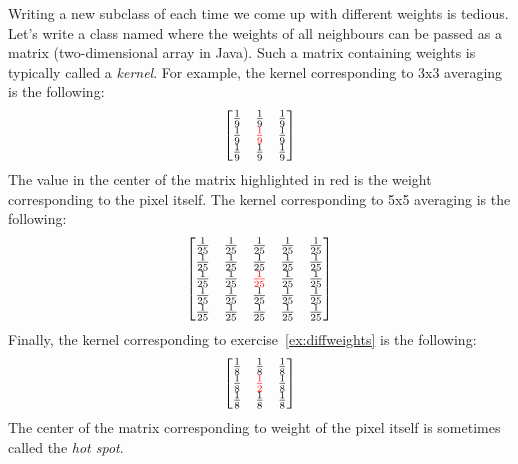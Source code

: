 \documentclass{book}
\begin{document}
Writing a new subclass of  each time we come up with different weights is tedious. Let's write a class named  where the weights of all neighbours can be passed as a matrix (two-dimensional array in Java). Such a matrix containing weights is typically called a \emph{kernel}. For example, the kernel corresponding to 3x3 averaging is the following:
$$
 \begin{bmatrix}
  \frac{1}{9} & \frac{1}{9} & \frac{1}{9} \\
  \frac{1}{9} & \textcolor{red}{\frac{1}{9}} & \frac{1}{9} \\
  \frac{1}{9} & \frac{1}{9} & \frac{1}{9}
 \end{bmatrix}
$$
The value in the center of the matrix highlighted in red is the weight corresponding to the pixel itself. The kernel corresponding to 5x5 averaging is the following:
$$
 \begin{bmatrix}
  \frac{1}{25} & \frac{1}{25} & \frac{1}{25} & \frac{1}{25} & \frac{1}{25}\\
  \frac{1}{25} & \frac{1}{25} & \frac{1}{25} & \frac{1}{25} & \frac{1}{25}\\
  \frac{1}{25} & \frac{1}{25} & \textcolor{red}{\frac{1}{25}} & \frac{1}{25} & \frac{1}{25}\\
  \frac{1}{25} & \frac{1}{25} & \frac{1}{25} & \frac{1}{25} & \frac{1}{25}\\
  \frac{1}{25} & \frac{1}{25} & \frac{1}{25} & \frac{1}{25} & \frac{1}{25}
 \end{bmatrix}
$$
Finally, the kernel corresponding to exercise~\ref{ex:diffweights} is the following:
$$
 \begin{bmatrix}
  \frac{1}{8} & \frac{1}{8} & \frac{1}{8} \\
  \frac{1}{8} & \textcolor{red}{\frac{1}{2}} & \frac{1}{8} \\
  \frac{1}{8} & \frac{1}{8} & \frac{1}{8}
 \end{bmatrix}
$$
The center of the matrix corresponding to weight of the pixel itself is sometimes called the \emph{hot spot}.
\end{document}
